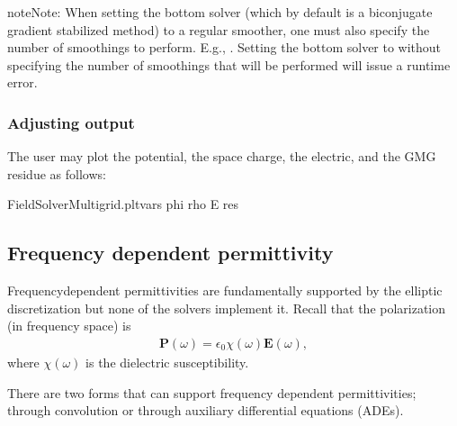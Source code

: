 \documentclass[letterpaper,10pt,english]{sphinxmanual}
\begin{document}
\begin{sphinxadmonition}{note}{Note:}
When setting the bottom solver (which by default is a biconjugate gradient stabilized method) to a regular smoother, one must also specify the number of smoothings to perform.
E.g., .
Setting the bottom solver to  without specifying the number of smoothings that will be performed will issue a run\sphinxhyphen{}time error.
\end{sphinxadmonition}


\subsubsection{Adjusting output}
\label{\detokenize{Solvers/Electrostatics:adjusting-output}}
The user may plot the potential, the space charge, the electric, and the GMG residue as follows:

\begin{sphinxVerbatim}[commandchars=\\\{\},formatcom=\scriptsize]
FieldSolverMultigrid.plt\PYGZus{}vars   phi rho E res     
\end{sphinxVerbatim}


\subsection{Frequency dependent permittivity}
\label{\detokenize{Solvers/Electrostatics:frequency-dependent-permittivity}}
Frequency\sphinxhyphen{}dependent permittivities are fundamentally supported by the  elliptic discretization but none of the solvers implement it.
Recall that the polarization (in frequency space) is
\begin{equation*}
\begin{split}\mathbf{P}(\omega) = \epsilon_0\chi(\omega)\mathbf{E}(\omega),\end{split}
\end{equation*}
where \(\chi(\omega)\) is the dielectric susceptibility.

There are two forms that  can support frequency dependent permittivities; through convolution or through auxiliary differential equations (ADEs).
\end{document}
